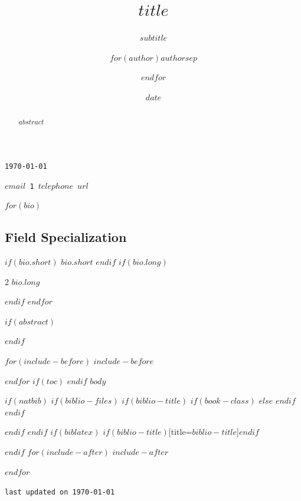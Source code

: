 \documentclass[10pt,$if(lang)$$lang$,$endif$$if(papersize)$$papersize$,$endif$$for(classoption)$$classoption$$sep$,$endfor$]{article}
\title{$title$}
\subtitle{$subtitle$}
\author{$for(author)$$author$$sep$ \and $endfor$}
\date{$date$}
\begin{document}
\hspace*{\fill} \texttt{\today}

  \texttt{$email$\bull
  \textsmaller {+}1 $telephone$\bull
  $url$}

$for(bio)$
\subsection{Field Specialization}
$if(bio.short)$
\noindent\emph{$bio.short$}
$endif$
$if(bio.long)$
\begin{multicols}{2}
$bio.long$
\end{multicols}
$endif$
$endfor$

$if(abstract)$
\begin{abstract}
$abstract$
\end{abstract}
$endif$

$for(include-before)$
$include-before$

$endfor$
$if(toc)$
{
\hypersetup{linkcolor=black}
\setcounter{tocdepth}{$toc-depth$}
\tableofcontents
}
$endif$
$body$

$if(natbib)$
$if(biblio-files)$
$if(biblio-title)$
$if(book-class)$
\renewcommand\bibname{$biblio-title$}
$else$
\renewcommand\refname{$biblio-title$}
$endif$
$endif$


$endif$
$endif$
$if(biblatex)$
\printbibliography$if(biblio-title)$[title=$biblio-title$]$endif$

$endif$
$for(include-after)$
$include-after$

$endfor$

\begin{center}
\texttt{last updated on \today}
\end{center}
\end{document}
